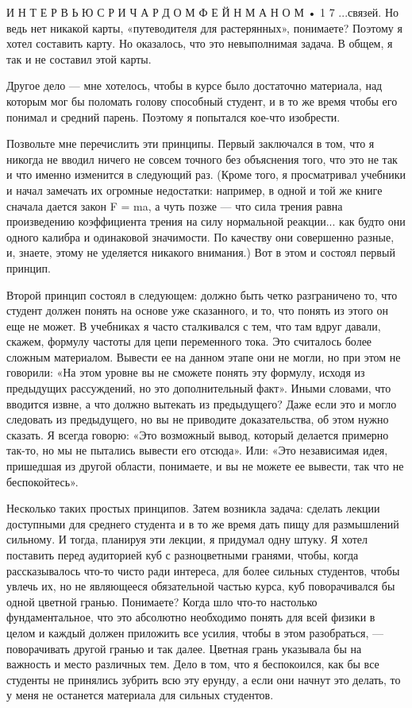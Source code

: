 \documentclass[10pt,oneside]{article}
\begin{document}
И Н Т Е Р В Ь Ю  С  Р И Ч А Р Д О М  Ф Е Й Н М А Н О М • 1 7 ...связей. Но ведь нет никакой карты, «путеводителя для растерянных», понимаете? Поэтому я хотел составить карту. Но оказалось, что это невыполнимая задача. В общем, я так и не составил этой карты.\par

Другое дело --- мне хотелось, чтобы в курсе было достаточно материала, над которым мог бы поломать голову способный студент, и в то же время чтобы его понимал и средний парень. Поэтому я попытался кое-что изобрести.\par

Позвольте мне перечислить эти принципы. Первый заключался в том, что я никогда не вводил ничего не совсем точного без объяснения того, что это не так и что именно изменится в следующий раз. (Кроме того, я просматривал учебники и начал замечать их огромные недостатки: например, в одной и той же книге сначала дается закон F = ma, а чуть позже --- что сила трения равна произведению коэффициента трения на силу нормальной реакции... как будто они одного калибра и одинаковой значимости. По качеству они совершенно разные, и, знаете, этому не уделяется никакого внимания.) Вот в этом и состоял первый принцип.\par

Второй принцип состоял в следующем: должно быть четко разграничено то, что студент должен понять на основе уже сказанного, и то, что понять из этого он еще не может. В учебниках я часто сталкивался с тем, что там вдруг давали, скажем, формулу частоты для цепи переменного тока. Это считалось более сложным материалом. Вывести ее на данном этапе они не могли, но при этом не говорили: «На этом уровне вы не сможете понять эту формулу, исходя из предыдущих рассуждений, но это дополнительный факт». Иными словами, что вводится извне, а что должно вытекать из предыдущего? Даже если это и могло следовать из предыдущего, но вы не приводите доказательства, об этом нужно сказать. Я всегда говорю: «Это возможный вывод, который делается примерно так-то, но мы не пытались вывести его отсюда». Или: «Это независимая идея, пришедшая из другой области, понимаете, и вы не можете ее вывести, так что не беспокойтесь».\par

Несколько таких простых принципов. Затем возникла задача: сделать лекции доступными для среднего студента и в то же время дать пищу для размышлений сильному. И тогда, планируя эти лекции, я придумал одну штуку. Я хотел поставить перед аудиторией куб с разноцветными гранями, чтобы, когда рассказывалось что-то чисто ради интереса, для более сильных студентов, чтобы увлечь их, но не являющееся обязательной частью курса, куб поворачивался бы одной цветной гранью. Понимаете? Когда шло что-то настолько фундаментальное, что это абсолютно необходимо понять для всей физики в целом и каждый должен приложить все усилия, чтобы в этом разобраться, --- поворачивать другой гранью и так далее. Цветная грань указывала бы на важность и место различных тем. Дело в том, что я беспокоился, как бы все студенты не принялись зубрить всю эту ерунду, а если они начнут это делать, то у меня не останется материала для сильных студентов.\par
\end{document}

